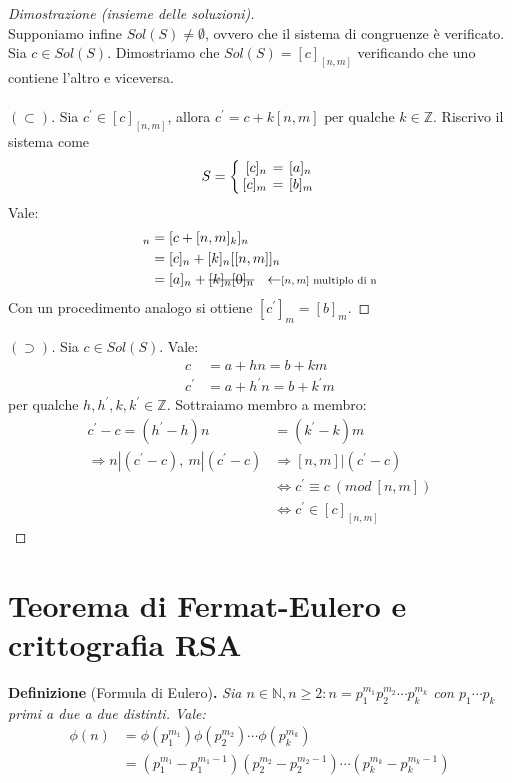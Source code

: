 \documentclass[12pt,twoside]{article}
\newcommand{\N}{\mathbb{N}}
\newcommand{\Z}{\mathbb{Z}}
\newcommand{\sesolose}{\Leftrightarrow}
\newcommand{\implica}{\Longrightarrow}
\newcommand{\pr}{\prime}
\newcommand{\pq}{\text{ per qualche }}
\renewcommand\qedsymbol{$\blacksquare$}
\newcommand{\stkout}[1]{\ifmmode\text{\sout{\ensuremath{#1}}}\else\sout{#1}\fi}
\begin{document}
\begin{proof}[Dimostrazione (insieme delle soluzioni)]\ \\
Supponiamo infine $Sol(S) \ne \emptyset$, ovvero che il sistema di congruenze è verificato. Sia $c \in Sol(S)$. Dimostriamo che $Sol(S) = [c]_{[n,m]}$ verificando che uno contiene l'altro e viceversa.
\\\\$(\subset)$.
Sia $ c^{\pr} \in [c]_{[n,m]}$, allora $c^{\pr} = c + k[n,m] \pq k \in \Z$. Riscrivo il sistema come
\[
S = \left\{
\setlength\arraycolsep{2pt}
\begin{array}{rcl} [c]_n & = & [a]_n \\ \relax
 [c]_m & = & [b]_m
\end{array}\right
.
\]
Vale:
\begin{align*}
[c^{\pr}]_n &= [c + [n,m]_k ]_n \\ 
&= [c]_n + [k]_n [[n,m]]_n \\
&= [a]_n + \stkout{[k]_n [0]_n} \ \ \leftarrow\scriptstyle{ \text{$[n,m]$ multiplo di n}}
\end{align*}
Con un procedimento analogo si ottiene $[c^{\pr}]_m = [b]_m$.
\end{proof}
\renewcommand\qedsymbol{$\blacksquare$}
\begin{proof}[$(\supset)$]
Sia $c \in Sol(S)$. Vale:
\begin{align*}
c &= a+hn = b + km \\
c^{\pr} &= a+h^{\pr}n = b + k^{\pr}m
\end{align*}
per qualche $h, h^{\pr}, k, k^{\pr} \in \Z$. Sottraiamo membro a membro:
\begin{align*}
c^{\pr} - c = (h^{\pr} - h)n &= (k^{\pr} - k)m \\
\implica n | (c^{\pr} -c),\ m|(c^{\pr} - c) &\implica [n, m]|(c^{\pr} - c) \\
&\sesolose c^{\pr} \equiv c \ (mod \ [n, m]) \\
&\sesolose c^{\pr} \in [c]_{[n,m]}
\end{align*}
\end{proof}

\section{Teorema di Fermat-Eulero e crittografia RSA}
\textbf{Definizione} (Formula di Eulero)\textbf{.} \textit{Sia $n \in \N, n \ge 2: n = p^{m_1}_1 p^{m_2}_2 \cdots p^{m_k}_k$ con $p_1 \cdots p_k$ primi a due a due distinti. Vale:
\begin{align*}
\phi(n) &= \phi(p^{m_1}_1)\phi(p^{m_2}_2) \cdots \phi(p^{m_k}_k) \\
&= (p^{m_1}_1 - p^{m_1 - 1}_1) (p^{m_2}_2 - p^{m_2 - 1}_2) \cdots (p^{m_k}_k - p^{m_k - 1}_k)
\end{align*}
}
\end{document}
